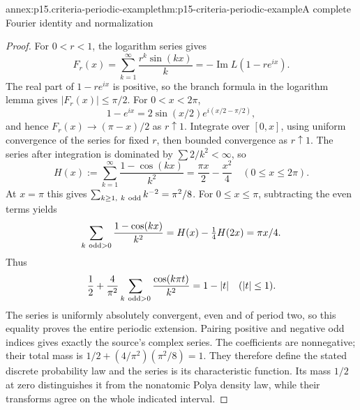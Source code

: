 \begin{annexitem}{annex:p15.criteria-periodic-example}{thm:p15-criteria-periodic-example}{A complete Fourier identity and normalization}
\begin{proof}
For \(0<r<1\), the logarithm series gives
\[
 F_r(x)=\sum_{k=1}^\infty\frac{r^k\sin(kx)}k
                         =-\operatorname{Im}L(1-re^{ix}).
\]
The real part of \(1-re^{ix}\) is positive, so the
branch formula in the logarithm lemma gives
\(|F_r(x)|\leq\pi/2\).
For \(0<x<2\pi\),
\[
 1-e^{ix}=2\sin(x/2)e^{i(x/2-\pi/2)},
\]
and hence \(F_r(x)\to(\pi-x)/2\) as \(r\uparrow1\).
Integrate over \([0,x]\), using uniform convergence
of the series for fixed \(r\), then bounded convergence
as \(r\uparrow1\).
The series after integration is dominated by
\(\sum 2/k^2<\infty\), so
\[
 H(x):=\sum_{k=1}^\infty\frac{1-\cos(kx)}{k^2}
                  =\frac{\pi x}{2}-\frac{x^2}{4}
                            \quad(0\leq x\leq2\pi).
\]
At \(x=\pi\) this gives
\(\sum_{k\geq1,\ k\ {\rm odd}}k^{-2}=\pi^2/8\).
For \(0\leq x\leq\pi\), subtracting the even terms yields
\[
 \sum_{k\ {\rm odd}>0}\frac{1-\cos(kx)}{k^2}
              =H(x)-\tfrac14H(2x)=\pi x/4.
\]
Thus
\[
 \frac12+\frac4{\pi^2}
       \sum_{k\ {\rm odd}>0}\frac{\cos(k\pi t)}{k^2}
                         =1-|t|\quad(|t|\leq1).
\]
The series is uniformly absolutely convergent, even
and of period two, so this equality proves the entire
periodic extension.
Pairing positive and negative odd indices gives
exactly the source's complex series.
The coefficients are nonnegative; their total mass
is \(1/2+(4/\pi^2)(\pi^2/8)=1\).
They therefore define the stated discrete probability
law and the series is its characteristic function.
Its mass \(1/2\) at zero distinguishes it from the
nonatomic Polya density law, while their transforms
agree on the whole indicated interval.
\end{proof}
\end{annexitem}

